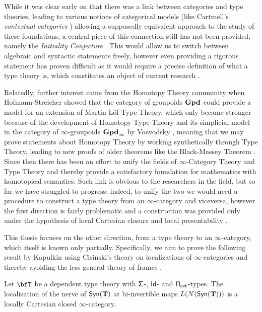 While it was clear early on that there was a link between categories and type
theories, leading to various notions of categorical models (like
Cartmell's \emph{contextual categories} \cite{Car78}) allowing a supposedly
equivalent approach to the study of these foundations, a central piece of this
connection still has not been provided, namely the \emph{Initiality Conjecture}
\cite{Str91}.
This would allow us to switch between algebraic and syntactic statements freely,
however even providing a rigorous statement has proven difficult as it would
require a precise definition of what a type theory is, which constitutes an
object of current research \cite{BHL20}.

Relatedly, further interest came from the Homotopy Theory community when
Hofmann-Streicher \cite{HS98} showed that the category of groupoids $\operatorname{\mathbf{Gpd}}$ could
provide a model for an extension of Martin-L{\"o}f Type Theory, which only
became stronger because of the development of Homotopy Type Theory and its
simplicial model in the category of $\infty$-groupoids $\operatorname{\mathbf{Gpd}_\infty}$ by
Voevodsky \cite{KL12}, meaning that we may prove statements about Homotopy
Theory by working synthetically through Type Theory, leading to new proofs of
older theorems like the Black-Massey Theorem \cite{HFLL16}. Since then there has
been an effort to unify the
fields of $\infty$-Category Theory and Type Theory and thereby provide a
satisfactory foundation for mathematics with homotopical semantics. Such link is
obvious to the researchers in the field, but so far we have struggled to
progress: indeed, to unify the two we would need a procedure to construct a type
theory from an $\infty$-category and viceversa, however the first direction is
fairly problematic and a construction was provided only under the hypothesis of
local Cartesian closure and local presentability \cite{Shu14}.

This thesis focuses on the other direction, from a type theory to an
$\infty$-category, which itself is known only partially. Specifically, we aim to
prove the following result by Kapulkin \cite[Thm.\ 9.3.17]{Kap14} using
Cisinski's theory on localizations of $\infty$-categories \cite{Cis19} and
thereby avoiding the less general theory of frames \cite{Szu14,KS15}.

\begin{finalthm}
  Let $\bfT$ be a dependent type theory with $\operatorname{\mathsf{\Sigma}}$-, $\operatorname{\mathsf{Id}}$- and
  $\operatorname{\mathsf{\Pi_{ext}}}$-types. The localization of the nerve of $\mathsf{Syn}(\mathbf{T})$ at bi-invertible
  maps $L(N(\mathsf{Syn}(\mathbf{T})))$ is a locally Cartesian closed $\infty$-category.
\end{finalthm}

